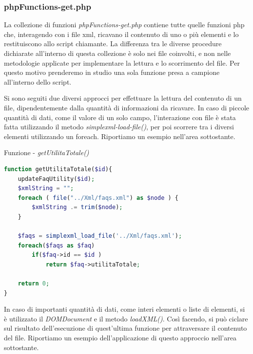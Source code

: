 \documentclass [a4paper,11pt]{book}
\begin{document}
\medskip

\subsubsection{phpFunctions-get.php}

La collezione di funzioni \emph{phpFunctions-get.php} contiene tutte quelle funzioni php che, interagendo con i file xml, ricavano il contenuto di uno o più elementi e lo restituiscono allo script chiamante. La differenza tra le diverse procedure dichiarate all'interno di questa collezione è solo nei file coinvolti, e non nelle metodologie applicate per implementare la lettura e lo scorrimento del file. Per questo motivo prenderemo in studio una sola funzione presa a campione all'interno dello script.

\medskip

Si sono seguiti due diversi approcci per effettuare la lettura del contenuto di un file, dipendentemente dalla quantità di informazioni da ricavare.
In caso di piccole quantità di dati, come il valore di un solo campo, l'interazione con file è stata fatta utilizzando il metodo \emph{simplexml-load-file()}, per poi scorrere tra i diversi elementi utilizzando un foreach. Riportiamo un esempio nell'area sottostante.

\medskip

Funzione - \emph{getUtilitaTotale()} 

\medskip

\begin{lstlisting}[language=PHP]
function getUtilitaTotale($id){
    updateFaqUtility($id);
    $xmlString = "";
    foreach ( file("../Xml/faqs.xml") as $node ) {
        $xmlString .= trim($node);
    }

    $faqs = simplexml_load_file('../Xml/faqs.xml');
    foreach($faqs as $faq)
        if($faq->id == $id )
            return $faq->utilitaTotale;

    return 0;
}
\end{lstlisting}

\medskip

In caso di importanti quantità di dati, come interi elementi o liste di elementi, si è utilizzato il \emph{DOMDocument} e il metodo \emph{loadXML()}. Così facendo, si può ciclare sul risultato dell'esecuzione di quest'ultima funzione per attraversare il contenuto del file. Riportiamo un esempio dell'applicazione di questo approccio nell'area sottostante.

\medskip
\end{document}
